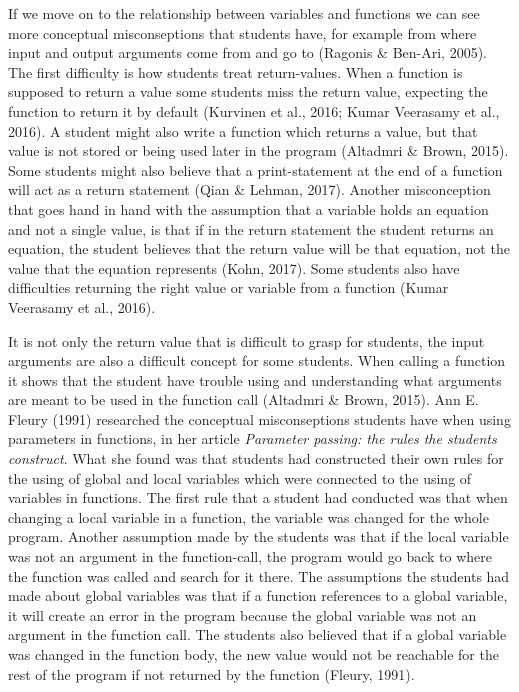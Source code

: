 \documentclass[twocolumn]{article}
\begin{document}
If we move on to the relationship between variables and functions we can see more conceptual misconseptions that students have, for example from where input and output arguments come from and go to (Ragonis \& Ben-Ari, 2005). The first difficulty is how students treat return-values. When a function is supposed to return a value some students miss the return value, expecting the function to return it by default (Kurvinen et al., 2016; Kumar Veerasamy et al., 2016). A student might also write a function which returns a value, but that value is not stored or being used later in the program (Altadmri \& Brown, 2015). Some students might also believe that a print-statement at the end of a function will act as a return statement (Qian \& Lehman, 2017). Another misconception that goes hand in hand with the assumption that a variable holds an equation and not a single value, is that if in the return statement the student returns an equation, the student believes that the return value will be that equation, not the value that the equation represents (Kohn, 2017). Some students also have difficulties returning the right value or variable from a function (Kumar Veerasamy et al., 2016). 

It is not only the return value that is difficult to grasp for students, the input arguments are also a difficult concept for some students. When calling a function it shows that the student have trouble using and understanding what arguments are meant to be used in the function call (Altadmri \& Brown, 2015). Ann E. Fleury (1991) researched the conceptual misconseptions students have when using parameters in functions, in her article \emph{Parameter passing: the rules the students construct}. What she found was that students had constructed their own rules for the using of global and local variables which were connected to the using of variables in functions. The first rule that a student had conducted was that when changing a local variable in a function, the variable was changed for the whole program. Another assumption made by the students was that if the local variable was not an argument in the function-call, the program would go back to where the function was called and search for it there. The assumptions the students had made about global variables was that if a function references to a global variable, it will create an error in the program because the global variable was not an argument in the function call. The students also believed that if a global variable was changed in the function body, the new value would not be reachable for the rest of the program if not returned by the function (Fleury, 1991).
\end{document}
